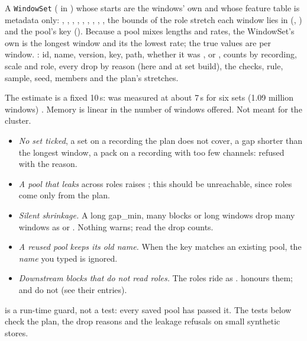 A \texttt{WindowSet} ( in ) whose starts
are the windows' own and whose feature table is metadata only: ,
, , , ,
, , , , the bounds of the
role stretch each window lies in (, ) and the pool's
key (). Because a pool mixes lengths and rates, the WindowSet's own
 is the longest window and its  the lowest rate; the true values are per
window. : id, name, version, key, path, whether it was ,
 or , counts by recording, scale and role, every drop by reason
(here and at set build), the checks, rule, sample, seed, members and the plan's stretches.

The estimate is a fixed 10\,s:  was measured at about 7\,s for six sets
(1.09 million windows) . Memory is linear in the
number of windows offered. Not meant for the cluster.

\begin{itemize}
\item \emph{No set ticked}, a set on a recording the plan does not cover, a gap shorter than
  the longest window, a pack on a recording with too few channels: refused with the reason.
\item \emph{A pool that leaks} across roles raises ; this should be
  unreachable, since roles come only from the plan.
\item \emph{Silent shrinkage.} A long gap\_min, many blocks or long windows drop many windows
  as  or . Nothing warns; read the drop counts.
\item \emph{A reused pool keeps its old name.} When the key matches an existing pool, the
  \emph{name} you typed is ignored.
\item \emph{Downstream blocks that do not read roles.} The roles ride as .
   honours them;  and
   do not (see their entries).
\end{itemize}

 is a run-time guard, not a test: every saved pool has passed it. The tests
below check the plan, the drop reasons and the leakage refusals on small synthetic stores.

